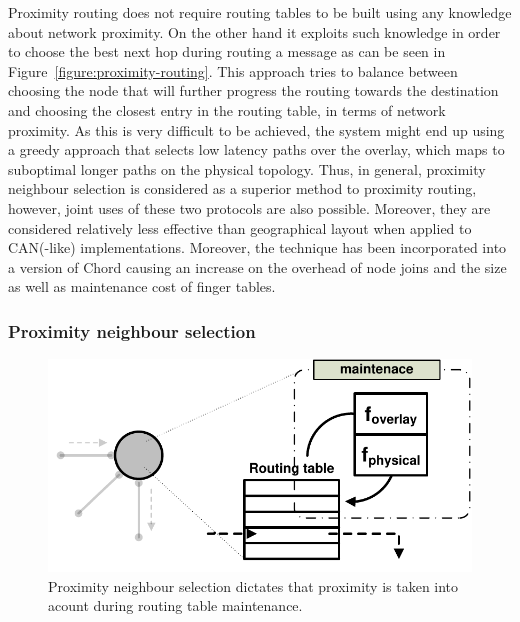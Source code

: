 Proximity routing does not require routing tables to be built using any
knowledge about network proximity. On the other hand it exploits such knowledge
in order to choose the best next hop during routing a message as can be seen in
Figure~\ref{figure:proximity-routing}. This approach tries to balance between
choosing the node that will further progress the routing towards the destination
and choosing the closest entry in the routing table, in terms of network
proximity. As this is very difficult to be achieved, the system might end up
using a greedy approach that selects low latency paths over the overlay, which
maps to suboptimal longer paths on the physical topology. Thus, in general,
proximity neighbour selection is considered as a superior method to proximity
routing, however, joint uses of these two protocols are also possible. Moreover,
they are considered relatively less effective than geographical layout when
applied to CAN(-like) implementations. Moreover, the technique has been
incorporated into a version of Chord causing an increase on the overhead of node
joins and the size as well as maintenance cost of finger tables.

%
%

\subsubsection{Proximity neighbour selection}

\begin{figure}[ht]
\centering
  \includegraphics[scale=0.4]{img/pdf/proximity-neighbour-selection.pdf}
\caption{Proximity neighbour selection dictates that proximity is taken into
acount during routing table maintenance.}
\label{figure:proximity-neighbour-selection}
\end{figure}

